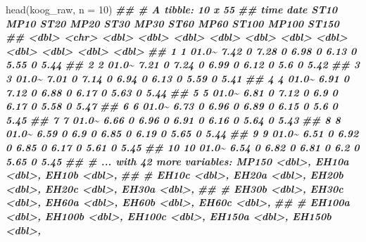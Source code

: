 \documentclass[
]{article}
\newenvironment{Shaded}{\begin{snugshade}}{\end{snugshade}}
\newcommand{\AttributeTok}[1]{\textcolor[rgb]{0.77,0.63,0.00}{#1}}
\newcommand{\DecValTok}[1]{\textcolor[rgb]{0.00,0.00,0.81}{#1}}
\newcommand{\DocumentationTok}[1]{\textcolor[rgb]{0.56,0.35,0.01}{\textbf{\textit{#1}}}}
\newcommand{\FunctionTok}[1]{\textcolor[rgb]{0.00,0.00,0.00}{#1}}
\newcommand{\NormalTok}[1]{#1}
\begin{document}
\begin{Shaded}
\begin{Highlighting}[]
\FunctionTok{head}\NormalTok{(koog\_raw, }\AttributeTok{n =} \DecValTok{10}\NormalTok{)}
\DocumentationTok{\#\# \# A tibble: 10 x 55}
\DocumentationTok{\#\#     time date   ST10  MP10  ST20  MP20  ST30  MP30  ST60  MP60 ST100 MP100 ST150}
\DocumentationTok{\#\#    \textless{}dbl\textgreater{} \textless{}chr\textgreater{} \textless{}dbl\textgreater{} \textless{}dbl\textgreater{} \textless{}dbl\textgreater{} \textless{}dbl\textgreater{} \textless{}dbl\textgreater{} \textless{}dbl\textgreater{} \textless{}dbl\textgreater{} \textless{}dbl\textgreater{} \textless{}dbl\textgreater{} \textless{}dbl\textgreater{} \textless{}dbl\textgreater{}}
\DocumentationTok{\#\#  1     1 01.0\textasciitilde{}  7.42     0  7.28     0  6.98     0  6.13     0  5.55     0  5.44}
\DocumentationTok{\#\#  2     2 01.0\textasciitilde{}  7.21     0  7.24     0  6.99     0  6.12     0  5.6      0  5.42}
\DocumentationTok{\#\#  3     3 01.0\textasciitilde{}  7.01     0  7.14     0  6.94     0  6.13     0  5.59     0  5.41}
\DocumentationTok{\#\#  4     4 01.0\textasciitilde{}  6.91     0  7.12     0  6.88     0  6.17     0  5.63     0  5.44}
\DocumentationTok{\#\#  5     5 01.0\textasciitilde{}  6.81     0  7.12     0  6.9      0  6.17     0  5.58     0  5.47}
\DocumentationTok{\#\#  6     6 01.0\textasciitilde{}  6.73     0  6.96     0  6.89     0  6.15     0  5.6      0  5.45}
\DocumentationTok{\#\#  7     7 01.0\textasciitilde{}  6.66     0  6.96     0  6.91     0  6.16     0  5.64     0  5.43}
\DocumentationTok{\#\#  8     8 01.0\textasciitilde{}  6.59     0  6.9      0  6.85     0  6.19     0  5.65     0  5.44}
\DocumentationTok{\#\#  9     9 01.0\textasciitilde{}  6.51     0  6.92     0  6.85     0  6.17     0  5.61     0  5.45}
\DocumentationTok{\#\# 10    10 01.0\textasciitilde{}  6.54     0  6.82     0  6.81     0  6.2      0  5.65     0  5.45}
\DocumentationTok{\#\# \# ... with 42 more variables: MP150 \textless{}dbl\textgreater{}, EH10a \textless{}dbl\textgreater{}, EH10b \textless{}dbl\textgreater{},}
\DocumentationTok{\#\# \#   EH10c \textless{}dbl\textgreater{}, EH20a \textless{}dbl\textgreater{}, EH20b \textless{}dbl\textgreater{}, EH20c \textless{}dbl\textgreater{}, EH30a \textless{}dbl\textgreater{},}
\DocumentationTok{\#\# \#   EH30b \textless{}dbl\textgreater{}, EH30c \textless{}dbl\textgreater{}, EH60a \textless{}dbl\textgreater{}, EH60b \textless{}dbl\textgreater{}, EH60c \textless{}dbl\textgreater{},}
\DocumentationTok{\#\# \#   EH100a \textless{}dbl\textgreater{}, EH100b \textless{}dbl\textgreater{}, EH100c \textless{}dbl\textgreater{}, EH150a \textless{}dbl\textgreater{}, EH150b \textless{}dbl\textgreater{},}

\end{Highlighting}
\end{Shaded}
\end{document}
